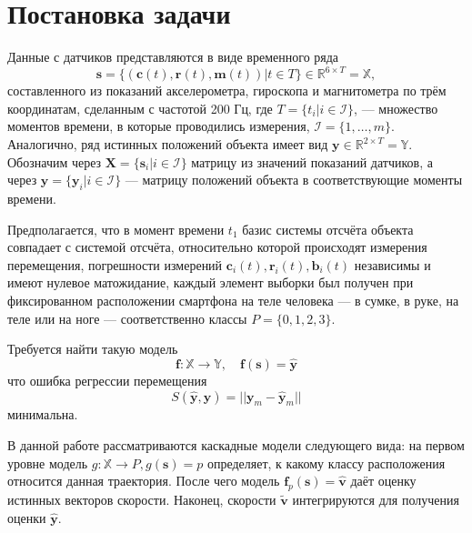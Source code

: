 \documentclass[12pt,twoside]{article}
\begin{document}
\section{Постановка задачи}
Данные с датчиков представляются в виде временного ряда 
\[
\mathbf{s} = \{ (\mathbf{c}(t), \mathbf{r}(t), \mathbf{m}(t)) | t \in T \} \in {\mathbb{R}^{6 \times T}} = \mathbb{X}, \label{eq:s} \tag{*}
\]
составленного из показаний акселерометра, гироскопа и магнитометра по трём координатам, сделанным с частотой 200 Гц, 
где 
$T = \{ t_i | i \in \mathcal{I} \}$, --- множество моментов времени, в которые проводились измерения, $\mathcal{I} = \{1, \ldots, m\}$.
Аналогично, ряд истинных положений объекта имеет вид $\mathbf{y} \in {\mathbb{R}^{2 \times T}} = \mathbb{Y}$.
Обозначим через $\mathbf{X} = \{ \mathbf{s}_i | i \in \mathcal{I} \} $ матрицу из значений показаний датчиков, 
а через $\mathbf{y} = \{ \mathbf{y}_i | i \in \mathcal{I} \}$ --- матрицу положений объекта в соответствующие моменты времени.

Предполагается, что 
в момент времени $t_1$ базис системы отсчёта объекта совпадает с системой отсчёта, относительно которой происходят измерения перемещения, 
погрешности измерений $\mathbf{c}_i(t), \mathbf{r}_i(t), \mathbf{b}_i(t)$ независимы и имеют нулевое матожидание, 
 каждый элемент выборки был получен при фиксированном расположении смартфона на теле человека --- в сумке, в руке, на теле или на ноге 
    --- соответственно классы $ P = \{0, 1, 2, 3 \} $.


Требуется найти такую модель 
$$ 
\mathbf{f}: \mathbb{X} \rightarrow \mathbb{Y}, \quad \mathbf{f}(\mathbf{s}) = \hat{\mathbf{y}} 
$$
что ошибка регрессии перемещения
$$
    S(\hat{\mathbf{y}}, \mathbf{y}) = ||\mathbf{y}_m - \hat{\mathbf{y}}_m||
$$
минимальна.

В данной работе рассматриваются каскадные модели следующего вида:
на первом уровне 
модель $g: \mathbb{X} \rightarrow P, g(\mathbf{s}) = p$ определяет, к какому классу расположения относится данная траектория. После чего
модель $\mathbf{f}_p(\mathbf{s}) = \hat{\mathbf{v}} $ даёт оценку истинных векторов скорости. Наконец, скорости $\tilde{\mathbf{v}}$ интегрируются для получения оценки $\hat{\mathbf{y}}$.

\end{document}
